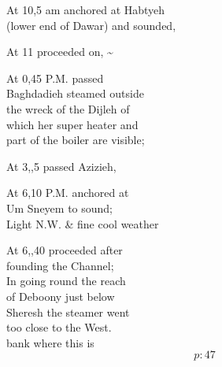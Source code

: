 \documentclass{report}
\begin{document}
	\par{
 	At 10,5 am anchored at Habtyeh\ \\(lower end of Dawar) and sounded,\ \\
	}

	\par{
 	At 11 proceeded on, \~{}\ \\
	}

	\par{
 	At 0,45 P.M. passed\ \\Baghdadieh steamed outside\ \\the wreck of the Dijleh of\ \\which her super heater and\ \\part of the boiler are visible;\ \\
	}

	\par{
 	At 3,,5 passed Azizieh,\ \\
	}

	\par{
 	At 6,10 P.M. anchored at\ \\Um Sneyem to sound;\ \\Light N.W. \& fine cool weather\ \\
	}

	\par{
 	At 6,,40 proceeded after\ \\founding the Channel;\ \\In going round the reach\ \\of Deboony just below\ \\Sheresh the steamer went\ \\too close to the West.\ \\bank where this is\ \\
  \[p: 47 \]

	}


\end{document}
